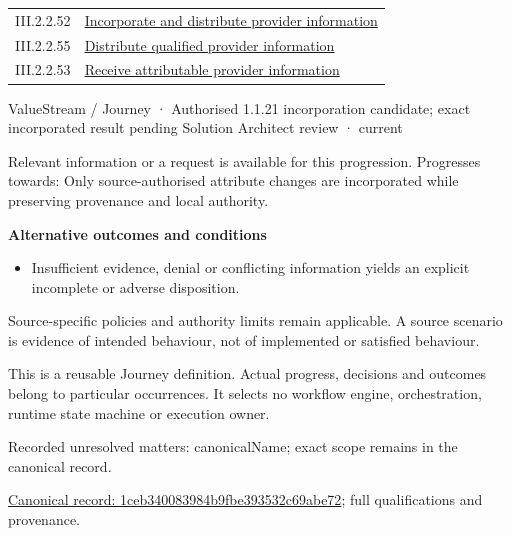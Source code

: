 \begin{longtable}{p{.22\linewidth}p{.73\linewidth}}
III.2.2.52 & \hyperref[element:9eb9f3210d5e4b46ac21463f54e62ab9]{Incorporate and distribute provider information} \\
III.2.2.55 & \hyperref[element:cfa9cb430ecd464dae89c710c4a040b5]{Distribute qualified provider information} \\
III.2.2.53 & \hyperref[element:db6083a887c24c55a32715f0c331c5d2]{Receive attributable provider information} \\
\end{longtable}
\label{element:1ceb340083984b9fbe393532c69abe72}
{\small ValueStream / Journey · Authorised 1.1.21 incorporation candidate; exact incorporated result pending Solution Architect review · current}\par

Relevant information or a request is available for this progression. Progresses towards: Only source-authorised attribute changes are incorporated while preserving provenance and local authority.



\par\medskip\textbf{Alternative outcomes and conditions}\par


\begin{itemize}


\item Insufficient evidence, denial or conflicting information yields an explicit incomplete or adverse disposition.

\end{itemize}


Source-specific policies and authority limits remain applicable. A source scenario is evidence of intended behaviour, not of implemented or satisfied behaviour.



This is a reusable Journey definition. Actual progress, decisions and outcomes belong to particular occurrences. It selects no workflow engine, orchestration, runtime state machine or execution owner.


{\small Recorded unresolved matters: canonicalName; exact scope remains in the canonical record.}\par
{\footnotesize \href{../../../../../../../continuum/strategy/value-stream/1ceb340083984b9fbe393532c69abe72.md}{Canonical record: 1ceb340083984b9fbe393532c69abe72}; full qualifications and provenance.}\par
